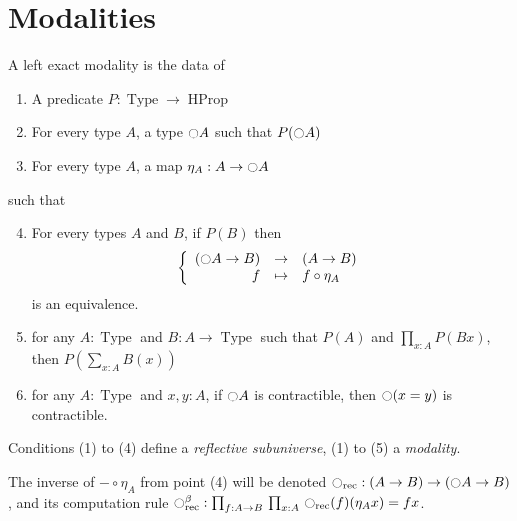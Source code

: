 \documentclass[notfinal]{jfrarticle}
\DeclareMathOperator{\Type}{Type}
\DeclareMathOperator{\HProp}{HProp}
\newcommand{\modal}{\ensuremath{\ocircle}}
\newcommand{\prodD}[3]{\prod_{#1:#2}\, #3}
\begin{document}




\section{Modalities}
\label{sec:modalities}

\begin{defi}
  \label{def:modality}
  A left exact modality is the data of
  \begin{enumerate}
  \item A predicate $P:\Type \to \HProp$
  \item For every type $A$, a type
    $\modal A$ such that $P(\modal A)$
  \item For every type $A$, a map $\eta_A:A \to
    \modal A$
  \end{enumerate}
  such that
  \begin{enumerate}
    \setcounter{enumi}{3}
  \item For every types $A$ and $B$, if $P(B)$ then
    \[ \left\{
        \begin{array}{rcl}
          (\modal A \to B) & \to & (A \to B) \\
          f & \mapsto & f \circ \eta_A
        \end{array} \right. \] %
    is an equivalence.
  \item for any $A:\Type$ and $B:A \to \Type$ such that $P(A)$
    and $\prod_{x:A} P(B x)$, then $P\left( \sum_{x:A} B(x)\right)$
  \item for any $A:\Type$ and $x,y:A$, if $\modal A$ is
    contractible, then $\modal (x=y)$ is contractible.
  \end{enumerate}
  Conditions (1) to (4) define a {\em reflective subuniverse}, (1) to
  (5) a {\em modality}.
\end{defi}

\begin{rmq}
  The inverse of $- \circ \eta_A$ from point {(4)} will be
  denoted $\modal_{\mathrm{rec}}: (A\to B) \to (\modal A \to B)$, and its
  computation rule $\modal_{\mathrm{rec}}^\beta : \prodD f {A \to B} {\prodD x A
  {\modal_{\mathrm{rec}}(f) (\eta_A x) = f x}}$.
\end{rmq}
\end{document}
